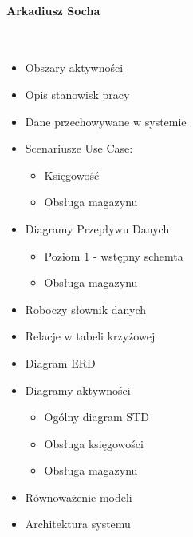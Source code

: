 \documentclass[paper=a4, fontsize=12pt]{scrartcl}
\numberwithin{equation}{section}		%
\numberwithin{figure}{section}			%
\numberwithin{table}{section}				%
\begin{document}
\paragraph{Arkadiusz Socha} \ \\
	\begin{itemize}
		\item Obszary aktywności
		\item Opis stanowisk pracy
		\item Dane przechowywane w systemie
		\item Scenariusze Use Case: 
			\begin{itemize}
				\item Księgowość
				\item Obsługa magazynu
			\end{itemize}
		\item Diagramy Przepływu Danych
			\begin{itemize}
				\item Poziom 1 - wstępny schemta
				\item Obsługa magazynu
			\end{itemize}
		\item Roboczy słownik danych
		\item Relacje w tabeli krzyżowej
		\item Diagram ERD
		\item Diagramy aktywności
			\begin{itemize}
				\item Ogólny diagram STD
				\item Obsługa księgowości
				\item Obsługa magazynu
			\end{itemize}
		\item Równoważenie modeli
		\item Architektura systemu
	\end{itemize}
\end{document}
